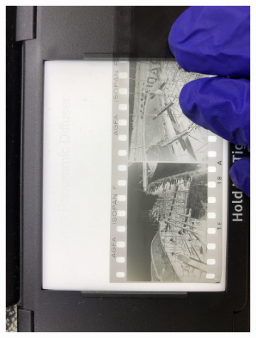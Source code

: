 \begin{figure}[H]
\begin{subfigure}{0.24\textwidth}
        \includegraphics[width=\linewidth]{Illustrations/P9.jpg}
        \caption{}
    \end{subfigure}
    \begin{subfigure}{0.24\textwidth}

\end{subfigure}
\end{figure}
